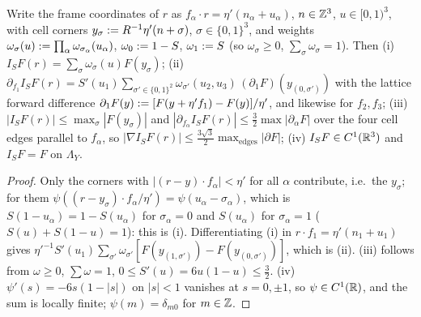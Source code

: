 \begin{lemma}\label{rot:hyb:lem:ESH}
Write the frame coordinates of $r$ as $f_\alpha\cdot r=\eta'(n_\alpha+u_\alpha)$, $n\in\mathbb Z^3$, $u\in[0,1)^3$, with cell corners $y_\sigma:= R^{-1}\eta'(n+\sigma)$, $\sigma\in\{0,1\}^3$, and weights $\omega_\sigma(u):=\prod_\alpha\omega_{\sigma_\alpha}(u_\alpha)$, $\omega_0:=1-S$, $\omega_1:= S$ (so $\omega_\sigma\ge0$, $\sum_\sigma\omega_\sigma=1$). Then
\textup{(i)} $I_SF(r)=\sum_\sigma\omega_\sigma(u)F(y_\sigma)$;
\textup{(ii)} $\partial_{f_1}I_SF(r)=S'(u_1)\sum_{\sigma'\in\{0,1\}^2}\omega_{\sigma'}(u_2,u_3)\,(\partial_1F)(y_{(0,\sigma')})$ with the lattice forward difference $\partial_1F(y):=[F(y+\eta'f_1)-F(y)]/\eta'$, and likewise for $f_2,f_3$;
\textup{(iii)} $|I_SF(r)|\le\max_\sigma|F(y_\sigma)|$ and $|\partial_{f_\alpha}I_SF(r)|\le\frac32\max|\partial_\alpha F|$ over the four cell edges parallel to $f_\alpha$, so $|\nabla I_SF(r)|\le\frac{3\sqrt3}2\max_{\mathrm{edges}}|\partial F|$;
\textup{(iv)} $I_SF\in C^1(\mathbb R^3)$ and $I_SF=F$ on $\Lambda_Y$.
\end{lemma}
\begin{proof}
Only the corners with $|(r-y)\cdot f_\alpha|<\eta'$ for all $\alpha$ contribute, i.e.\ the $y_\sigma$; for them $\psi((r-y_\sigma)\cdot f_\alpha/\eta')=\psi(u_\alpha-\sigma_\alpha)$, which is $S(1-u_\alpha)=1-S(u_\alpha)$ for $\sigma_\alpha=0$ and $S(u_\alpha)$ for $\sigma_\alpha=1$ ($S(u)+S(1-u)=1$): this is (i). Differentiating (i) in $r\cdot f_1=\eta'(n_1+u_1)$ gives $\eta'^{-1}S'(u_1)\sum_{\sigma'}\omega_{\sigma'}[F(y_{(1,\sigma')})-F(y_{(0,\sigma')})]$, which is (ii). (iii) follows from $\omega\ge0$, $\sum\omega=1$, $0\le S'(u)=6u(1-u)\le\frac32$. (iv) $\psi'(s)=-6s(1-|s|)$ on $|s|<1$ vanishes at $s=0,\pm1$, so $\psi\in C^1(\mathbb R)$, and the sum is locally finite; $\psi(m)=\delta_{m0}$ for $m\in\mathbb Z$.
\end{proof}

